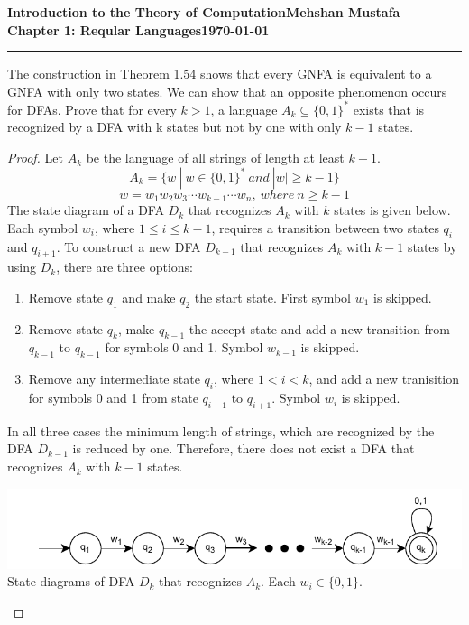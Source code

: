\documentclass[11pt]{article}
\newcommand{\myname}{Mehshan Mustafa}
\newcommand{\dated}{\today}
\newenvironment{problem}[2][Problem]{\begin{trivlist}
\item[\hskip \labelsep {\bfseries #1}\hskip \labelsep {\bfseries #2.}]}{\end{trivlist}}
\begin{document}
\textbf{Introduction to the Theory of
Computation}\hfill\textbf{\myname}\\[0.01in]
\textbf{Chapter 1: Reqular Languages}\hfill\textbf{\dated}\\
\smallskip\hrule\bigskip

\begin{problem}{1.39}
The construction in Theorem 1.54 shows that every GNFA is equivalent to a GNFA with only two states. We can show that an opposite phenomenon occurs for DFAs. Prove that for every $k > 1$, a language $A_{k} \subseteq \{0,1\}^{*}$ exists that is recognized by a DFA with k states but not by one with only $k-1$ states.
\end{problem}

\begin{proof}
Let $A_{k}$ be the language of all strings of length at least $k-1$.
\[ A_{k} = \{ w \ | \ w \in \{0, 1\}^{*} \ and \ |w| \geq k-1 \} \]
\[ w = w_{1}w_{2}w_{3} \cdots w_{k-1} \cdots w_{n}, \ where \ n \geq k-1 \]
The state diagram of a DFA $D_{k}$ that recognizes $A_{k}$ with $k$ states is given below. Each symbol $w_{i}$, where $1 \leq i \leq k-1$, requires a transition between two states $q_{i}$ and $q_{i+1}$. To construct a new DFA $D_{k-1}$ that recognizes $A_{k}$ with $k-1$ states by using $D_{k}$, there are three options:
\begin{enumerate}
\item Remove state $q_{1}$ and make $q_{2}$ the start state. First symbol $w_{1}$ is skipped. 
\item Remove state $q_{k}$, make $q_{k-1}$ the accept state and add a new transition from $q_{k-1}$ to $q_{k-1}$ for symbols 0 and 1. Symbol $w_{k-1}$ is skipped. 
\item Remove any intermediate state $q_{i}$, where $1 < i < k$, and add a new tranisition for symbols 0 and 1 from state $q_{i-1}$ to $q_{i+1}$. Symbol $w_{i}$ is skipped. 
\end{enumerate}
In all three cases the minimum length of strings, which are recognized by the DFA $D_{k-1}$ is reduced by one. Therefore, there does not exist a DFA that recognizes $A_{k}$ with $k-1$ states.
\begin{center}
\includegraphics[scale=1.0]{Figures/Problem1.39.pdf} \\
State diagrams of DFA $D_{k}$ that recognizes $A_{k}$. Each $w_{i} \in \{0,1\}$.
\end{center}
\end{proof}
\end{document}
